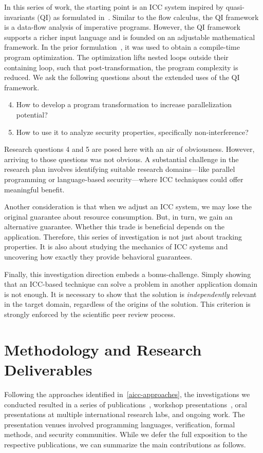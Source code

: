 In this series of work, the starting point is an ICC system inspired by quasi-invariants (QI) as formulated in~\cite{moyen20172}.
Similar to the flow calculus, the QI framework is a data-flow analysis of imperative programs.
However, the QI framework supports a richer input language and is founded on an adjustable mathematical framework.
In the prior formulation~\cite{moyen20172}, it was used to obtain a compile-time program optimization.
The optimization lifts nested loops outside their containing loop, such that post-transformation, the program complexity is reduced.
We ask the following questions about the extended uses of the QI framework.
\begin{enumerate}[label={(RQ\arabic*)}]
\setcounter{enumi}{3}
\item How to develop a program transformation to increase parallelization potential?
\item How to use it to analyze security properties, specifically non-interference?
\end{enumerate}
Research questions 4 and 5 are posed here with an air of obviousness.
However, arriving to those questions was not obvious.
A substantial challenge in the research plan involves identifying suitable research domains---like parallel programming or language-based security---where ICC techniques could offer meaningful benefit.

Another consideration is that when we adjust an ICC system, we may lose the original guarantee about resource consumption.
But, in turn, we gain an alternative guarantee.
Whether this trade is beneficial depends on the application.
Therefore, this series of investigation is not just about tracking properties.
It is also about studying the mechanics of ICC systems and uncovering how exactly they provide behavioral guarantees.

Finally, this investigation direction embeds a bonus-challenge.
Simply showing that an ICC-based technique can solve a problem in another application domain is not enough.
It is necessary to show that the solution is \emph{independently} relevant in the target domain, regardless of the origins of the solution.
This criterion is strongly enforced by the scientific peer review process.

\section{Methodology and Research Deliverables}
\label{aicc-methods}

Following the approaches identified in~\autoref{aicc-approaches},
the investigations we conducted resulted in a series of publications~\cite{aubert20222,aubert20232,aubert2023b}, workshop presentations~\cite{aubert20231,aubert202217,splash22,plas2024},
oral presentations at multiple international research labs, and ongoing work.
The presentation venues involved programming languages, verification, formal methods, and security communities.
While we defer the full exposition to the respective publications,
we can summarize the main contributions as follows.

